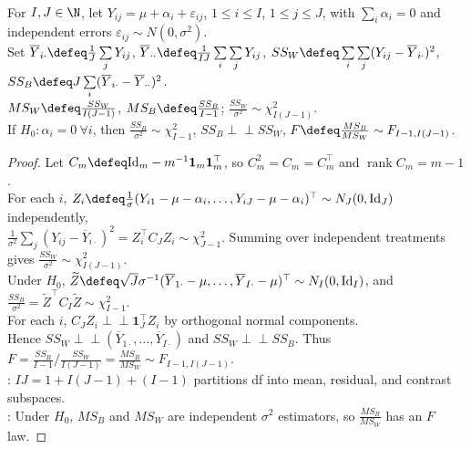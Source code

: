\begin{theorem} \label{thm:one-way-anova-f-test} \\
For $I,J\in\N$, let $Y_{ij}=\mu+\alpha_i+\varepsilon_{ij}$, $1\leq i\leq I$, $1\leq j\leq J$, with $\sum\limits_i\alpha_i=0$ and independent errors $\varepsilon_{ij}\sim N(0,\sigma^2)$.\\
Set $\overline{Y}_{i\cdot}\defeq \frac{1}{J}\sum\limits_jY_{ij}$, $\overline{Y}_{\cdot\cdot}\defeq \frac{1}{IJ}\sum\limits_i\sum\limits_jY_{ij}$, $SS_W\defeq\sum\limits_i\sum\limits_j(Y_{ij}-\overline{Y}_{i\cdot})^2$, $SS_B\defeq J\sum\limits_i(\overline{Y}_{i\cdot}-\overline{Y}_{\cdot\cdot})^2$.\\
$MS_W\defeq \frac{SS_W}{I(J-1)}$, $MS_B\defeq \frac{SS_B}{I-1}$; $\frac{SS_W}{\sigma^2}\sim \chi^2_{I(J-1)}$.\\
If $H_0:\alpha_i=0\ \forall i$, then $\frac{SS_B}{\sigma^2}\sim \chi^2_{I-1}$, $SS_B\perp\!\!\!\perp SS_W$, $F\defeq \frac{MS_B}{MS_W}\sim F_{I-1,I(J-1)}$.
\begin{proof} Let $C_m\defeq \mathrm{Id}_m-m^{-1}\mathbf{1}_m\mathbf{1}_m^\top$, so $C_m^2=C_m=C_m^\top$ and $\operatorname{rank}C_m=m-1$.\\
For each $i$, $Z_i\defeq\frac{1}{\sigma}(Y_{i1}-\mu-\alpha_i,\ldots,Y_{iJ}-\mu-\alpha_i)^\top\sim N_J(0,\mathrm{Id}_J)$ independently,\\
$\frac{1}{\sigma^2}\sum\limits_j(Y_{ij}-\overline{Y}_{i\cdot})^2=Z_i^\top C_JZ_i\sim\chi^2_{J-1}$. Summing over independent treatments gives $\frac{SS_W}{\sigma^2}\sim\chi^2_{I(J-1)}$.\\
Under $H_0$, $\widetilde{Z}\defeq \sqrt{J}\sigma^{-1}(\overline{Y}_{1\cdot}-\mu,\ldots,\overline{Y}_{I\cdot}-\mu)^\top\sim N_I(0,\mathrm{Id}_I)$, and $\frac{SS_B}{\sigma^2}=\widetilde{Z}^\top C_I\widetilde{Z}\sim\chi^2_{I-1}$.\\
For each $i$, $C_JZ_i\perp\!\!\!\perp \mathbf{1}_J^\top Z_i$ by orthogonal normal components.\\
Hence $SS_W\perp\!\!\!\perp(\overline{Y}_{1\cdot},\ldots,\overline{Y}_{I\cdot})$ and $SS_W\perp\!\!\!\perp SS_B$. Thus $F=\frac{SS_B}{I-1}/\frac{SS_W}{I(J-1)}=\frac{MS_B}{MS_W}\sim F_{I-1,I(J-1)}$.\\
: $IJ=1+I(J-1)+(I-1)$ partitions df into mean, residual, and contrast subspaces.\\
: Under $H_0$, $MS_B$ and $MS_W$ are independent $\sigma^2$ estimators, so $\frac{MS_B}{MS_W}$ has an $F$ law.
\end{proof}
\end{theorem}

